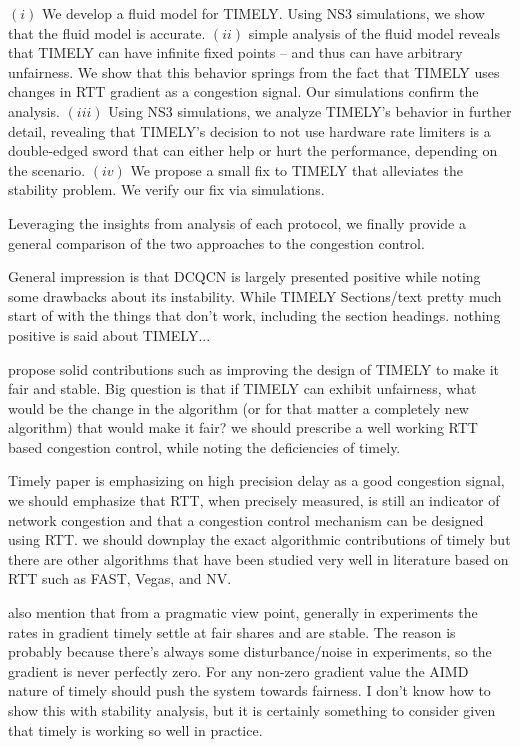  $(i)$ We develop a fluid model for TIMELY. Using NS3 simulations,
we show that the fluid model is accurate. $(ii)$ simple analysis of the fluid model
reveals that TIMELY can have infinite fixed points -- and thus can have
arbitrary unfairness. We show that this behavior springs from the fact that
TIMELY uses changes in RTT gradient as a congestion signal.
Our simulations confirm the analysis. $(iii)$ Using NS3
simulations, we analyze TIMELY's behavior in further detail, revealing that
TIMELY's decision to not use hardware rate limiters is a double-edged sword that
can either help or hurt the performance, depending on the scenario. $(iv)$ We
propose a small fix to TIMELY that alleviates the stability problem. We verify
our fix via simulations.

Leveraging the insights from analysis of each protocol, we finally provide a
general comparison of the two approaches to the congestion control.


General impression is that DCQCN is largely presented positive while noting some
drawbacks about its instability. While TIMELY Sections/text pretty much start of
with the things that don't work, including the section headings. nothing
positive is said about TIMELY...

propose solid contributions such as improving the design of TIMELY to make it
fair and stable. Big question is that if TIMELY can exhibit unfairness, what
would be the change in the algorithm (or for that matter a completely new
algorithm) that would make it fair? we should prescribe a well working RTT based
congestion control, while noting the deficiencies of timely.

Timely paper is emphasizing on high precision delay as a good congestion signal,
we should emphasize that RTT, when precisely measured, is still an indicator of
network congestion and that a congestion control mechanism can be designed using
RTT. we should downplay the exact algorithmic contributions of timely but there
are other algorithms that have been studied very well in literature based on RTT
such as FAST, Vegas, and NV.

also mention that from a pragmatic view point, generally in experiments the
rates in gradient timely settle at fair shares and are stable. The reason is
probably because there's always some disturbance/noise in experiments, so the
gradient is never perfectly zero. For any non-zero gradient value the AIMD
nature of timely should push the system towards fairness. I don't know how to
show this with stability analysis, but it is certainly something to consider
given that timely is working so well in practice.


